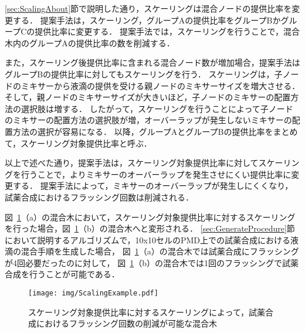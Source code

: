 \ref{sec:ScalingAbout}節で説明した通り，スケーリングは混合ノードの提供比率を変更する．
提案手法は，スケーリング，グループAの提供比率をグループBかグループCの提供比率に変更する．
提案手法では，スケーリングを行うことで，混合木内のグループAの提供比率の数を削減する．

また，スケーリング後提供比率に含まれる混合ノード数が増加場合，提案手法はグループBの提供比率に対してもスケーリングを行う．
スケーリングは，子ノードのミキサーから液滴の提供を受ける親ノードのミキサーサイズを増大させる．
そして，親ノードのミキサーサイズが大きいほど，子ノードのミキサーの配置方法の選択肢は増する．
したがって，スケーリングを行うことによって子ノードのミキサーの配置方法の選択肢が増，オーバーラップが発生しないミキサーの配置方法の選択が容易になる．
以降，グループAとグループBの提供比率をまとめて，スケーリング対象提供比率と呼ぶ．

以上で述べた通り，提案手法は，スケーリング対象提供比率に対してスケーリングを行うことで，よりミキサーのオーバーラップを発生させにくい提供比率に変更する．
提案手法によって，ミキサーのオーバーラップが発生しにくくなり，試薬合成におけるフラッシング回数は削減される．

図~\ref{fig:ScalingAllTargetRatio}（a）の混合木において，スケーリング対象提供比率に対するスケーリングを行った場合，図~\ref{fig:ScalingAllTargetRatio}（b）の混合木へと変形される．
\ref{sec:GenerateProcedure}節において説明するアルゴリズムで，10x10セルのPMD上での試薬合成における液滴の混合手順を生成した場合，
図~\ref{fig:ScalingAllTargetRatio}（a）の混合木では試薬合成にフラッシングが4回必要だったのに対して，
図~\ref{fig:ScalingAllTargetRatio}（b）の混合木では1回のフラッシングで試薬合成を行うことが可能である．


\begin{figure}[tbp]
    \centering\texttt{[image: img/ScalingExample.pdf]}
 \caption{スケーリング対象提供比率に対するスケーリングによって，試薬合成におけるフラッシング回数の削減が可能な混合木}\label{fig:ScalingAllTargetRatio}
\end{figure}



